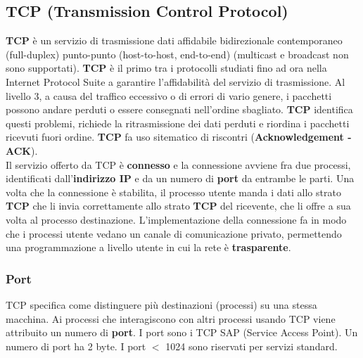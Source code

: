 \documentclass{article}
\begin{document}
\subsection{TCP (Transmission Control Protocol)}
\textbf{TCP} è un servizio di trasmissione dati affidabile bidirezionale contemporaneo (full-duplex) punto-punto (host-to-host, end-to-end) (multicast e broadcast non sono supportati). \textbf{TCP} è il primo tra i protocolli studiati fino ad ora nella Internet Protocol Suite a garantire l'affidabilità del servizio di trasmissione. Al livello 3, a causa del traffico eccessivo o di errori di vario genere, i pacchetti possono andare perduti o essere consegnati nell'ordine sbagliato. \textbf{TCP} identifica questi problemi, richiede la ritrasmissione dei dati perduti e riordina i pacchetti ricevuti fuori ordine. \textbf{TCP} fa uso sitematico di riscontri (\textbf{Acknowledgement - ACK}).\\
Il servizio offerto da TCP è \textbf{connesso} e la connessione avviene fra due processi, identificati dall'\textbf{indirizzo IP} e da un numero di \textbf{port} da entrambe le parti. Una volta che la connessione è stabilita, il processo utente manda i dati allo strato \textbf{TCP} che li invia correttamente allo strato \textbf{TCP} del ricevente, che li offre a sua volta al processo destinazione. L'implementazione della connessione fa in modo che i processi utente vedano un canale di comunicazione privato, permettendo una programmazione a livello utente in cui la rete è \textbf{trasparente}.
\subsubsection{Port}
TCP specifica come distinguere più destinazioni (processi) su una stessa macchina. Ai processi che interagiscono con altri processi usando TCP viene attribuito un numero di \textbf{port}. I port sono i TCP SAP (Service Access Point). Un numero di port ha 2 byte. I port $<$ 1024 sono riservati per servizi standard.
\end{document}
